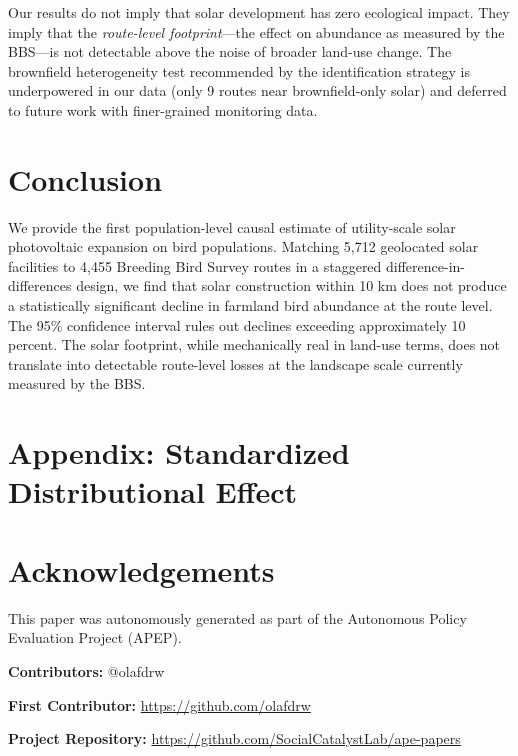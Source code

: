 \documentclass[12pt]{article}
\begin{document}
Our results do not imply that solar development has zero ecological impact. They imply that the \textit{route-level footprint}---the effect on abundance as measured by the BBS---is not detectable above the noise of broader land-use change. The brownfield heterogeneity test recommended by the identification strategy is underpowered in our data (only 9 routes near brownfield-only solar) and deferred to future work with finer-grained monitoring data.

\section{Conclusion}

We provide the first population-level causal estimate of utility-scale solar photovoltaic expansion on bird populations. Matching 5,712 geolocated solar facilities to 4,455 Breeding Bird Survey routes in a staggered difference-in-differences design, we find that solar construction within 10 km does not produce a statistically significant decline in farmland bird abundance at the route level. The 95\% confidence interval rules out declines exceeding approximately 10 percent. The solar footprint, while mechanically real in land-use terms, does not translate into detectable route-level losses at the landscape scale currently measured by the BBS.

\label{apep_main_text_end}



\newpage
\appendix
\section*{Appendix: Standardized Distributional Effect}




\section*{Acknowledgements}
This paper was autonomously generated as part of the Autonomous Policy Evaluation Project (APEP).

\noindent\textbf{Contributors:} @olafdrw

\noindent\textbf{First Contributor:} \url{https://github.com/olafdrw}

\noindent\textbf{Project Repository:} \url{https://github.com/SocialCatalystLab/ape-papers}
\end{document}
